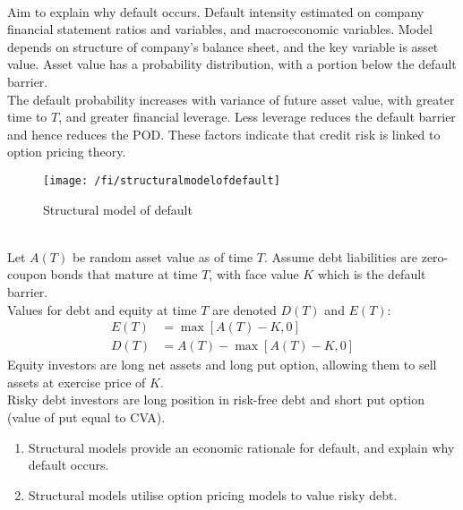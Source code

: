 \begin{remark} \\
Aim to explain why default occurs. Default intensity estimated on company financial statement ratios and variables, and macroeconomic variables. Model depends on structure of company's balance sheet, and the key variable is asset value. Asset value has a probability distribution, with a portion below the default barrier. \\
The default probability increases with variance of future asset value, with greater time to $T$, and greater financial leverage. Less leverage reduces the default barrier and hence reduces the POD. These factors indicate that credit risk is linked to option pricing theory.
\end{remark}

\begin{figure}[H]
\centering
\texttt{[image: /fi/structuralmodelofdefault]}
\caption{Structural model of default}
\end{figure}

\begin{remark} \\
Let $A(T)$ be random asset value as of time $T$. Assume debt liabilities are zero-coupon bonds that mature at time $T$, with face value $K$ which is the default barrier.\\
Values for debt and equity at time $T$ are denoted $D(T)$ and $E(T)$:
\begin{align}
E(T) &= \max [A(T) - K, 0] \nonumber \\
D(T) &= A(T) - \max[A(T) - K, 0] \nonumber
\end{align}
Equity investors are long net assets and long put option, allowing them to sell assets at exercise price of $K$.\\
Risky debt investors are long position in risk-free debt and short put option (value of put  equal to CVA).
\end{remark}

\begin{remark} 
\begin{enumerate}[label=\roman*.]
\setlength{\itemsep}{0pt}
\item Structural models provide an economic rationale for default, and explain why default occurs.
\item Structural models utilise option pricing models to value risky debt.
\end{enumerate}
\end{remark}

